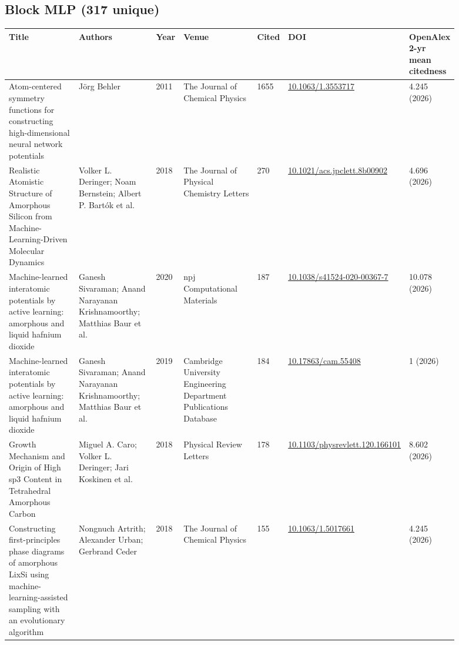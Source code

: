 \documentclass[10pt,a4paper]{article}
\begin{document}
\subsection*{Block MLP (317 unique)}
{\scriptsize\begin{longtable}{p{0.192\linewidth}p{0.192\linewidth}p{0.043\linewidth}p{0.192\linewidth}p{0.043\linewidth}p{0.132\linewidth}p{0.096\linewidth}}
\hline
\textbf{Title} & \textbf{Authors} & \textbf{Year} & \textbf{Venue} & \textbf{Cited} & \textbf{DOI} & \textbf{OpenAlex 2-yr mean citedness} \\ \hline
\endhead
Atom-centered symmetry functions for constructing high-dimensional neural network potentials & Jörg Behler & 2011 & The Journal of Chemical Physics & 1655 & \href{https://doi.org/10.1063/1.3553717}{10.1063/1.3553717} & 4.245 (2026) \\
Realistic Atomistic Structure of Amorphous Silicon from Machine-Learning-Driven Molecular Dynamics & Volker L. Deringer; Noam Bernstein; Albert P. Bartók et al. & 2018 & The Journal of Physical Chemistry Letters & 270 & \href{https://doi.org/10.1021/acs.jpclett.8b00902}{10.1021/acs.jpclett.8b00902} & 4.696 (2026) \\
Machine-learned interatomic potentials by active learning: amorphous and liquid hafnium dioxide & Ganesh Sivaraman; Anand Narayanan Krishnamoorthy; Matthias Baur et al. & 2020 & npj Computational Materials & 187 & \href{https://doi.org/10.1038/s41524-020-00367-7}{10.1038/s41524-020-00367-7} & 10.078 (2026) \\
Machine-learned interatomic potentials by active learning: amorphous and liquid hafnium dioxide & Ganesh Sivaraman; Anand Narayanan Krishnamoorthy; Matthias Baur et al. & 2019 & Cambridge University Engineering Department Publications Database & 184 & \href{https://doi.org/10.17863/cam.55408}{10.17863/cam.55408} & 1 (2026) \\
Growth Mechanism and Origin of High sp3 Content in Tetrahedral Amorphous Carbon & Miguel A. Caro; Volker L. Deringer; Jari Koskinen et al. & 2018 & Physical Review Letters & 178 & \href{https://doi.org/10.1103/physrevlett.120.166101}{10.1103/physrevlett.120.166101} & 8.602 (2026) \\
Constructing first-principles phase diagrams of amorphous LixSi using machine-learning-assisted sampling with an evolutionary algorithm & Nongnuch Artrith; Alexander Urban; Gerbrand Ceder & 2018 & The Journal of Chemical Physics & 155 & \href{https://doi.org/10.1063/1.5017661}{10.1063/1.5017661} & 4.245 (2026) \\

\end{longtable}}
\end{document}
